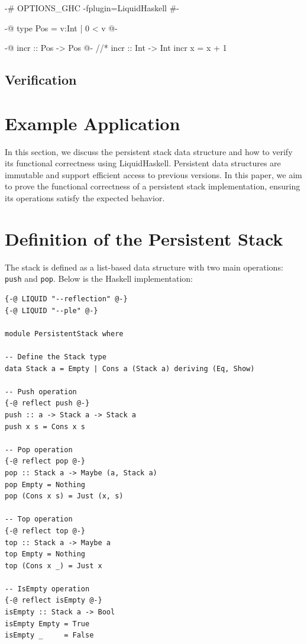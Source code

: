 \documentclass[]{rptuseminar}
\begin{document}
\begin{haskell}
 {-# OPTIONS_GHC -fplugin=LiquidHaskell #-}

 {-@ type Pos = {v:Int | 0 < v} @-}

 {-@ incr :: Pos -> Pos @-} //*\label{srcline:typerefinement}
 incr :: Int -> Int
 incr x = x + 1 
\end{haskell}

\subsection{Verification}

\section{Example Application}

In this section, we discuss the persistent stack data structure and how to verify its functional correctness using LiquidHaskell. Persistent data structures are immutable and support efficient access to previous versions. In this paper, we aim to prove the functional correctness of a persistent stack implementation, ensuring its operations satisfy the expected behavior.

\section{Definition of the Persistent Stack}
The stack is defined as a list-based data structure with two main operations: \texttt{push} and \texttt{pop}. Below is the Haskell implementation:

\begin{lstlisting}[caption=Persistent Stack Implementation]
{-@ LIQUID "--reflection" @-}
{-@ LIQUID "--ple" @-}

module PersistentStack where

-- Define the Stack type
data Stack a = Empty | Cons a (Stack a) deriving (Eq, Show)

-- Push operation
{-@ reflect push @-}
push :: a -> Stack a -> Stack a
push x s = Cons x s

-- Pop operation
{-@ reflect pop @-}
pop :: Stack a -> Maybe (a, Stack a)
pop Empty = Nothing
pop (Cons x s) = Just (x, s)

-- Top operation
{-@ reflect top @-}
top :: Stack a -> Maybe a
top Empty = Nothing
top (Cons x _) = Just x

-- IsEmpty operation
{-@ reflect isEmpty @-}
isEmpty :: Stack a -> Bool
isEmpty Empty = True
isEmpty _     = False
\end{lstlisting}
\end{document}
